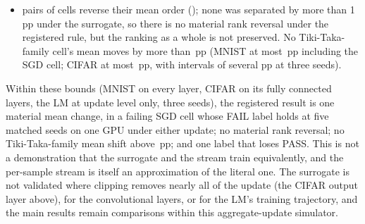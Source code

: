 \begin{itemize}
      ([\RYFidCifarEcramLiTangTwoZeroOneEightCttvTwoSeqLo, \RYFidCifarEcramLiTangTwoZeroOneEightCttvTwoSeqHi]\,pp) is wider and
      includes the line. This is not a failure, but the label is not preserved, and the difference interval
      ([\RXFidCifarEcramLiTangTwoZeroOneEightCttvTwoLo, \RXFidCifarEcramLiTangTwoZeroOneEightCttvTwoHi]\,pp) does not bound
      the change within $\pm1$\,pp.
\item \RYFidRevN{} pairs of cells reverse their mean order (\RYFidRevList); none was separated by more than 1\,pp under the
      surrogate, so there is no material rank reversal under the registered rule, but the ranking as a whole is not preserved.
      No Tiki-Taka-family cell's mean moves by more than \RXFidTtMaxAbs\,pp (MNIST at most \RXFidMnistMaxAbs\,pp including the
      SGD cell; CIFAR at most \RXFidCifarMaxAbs\,pp, with intervals of several pp at three seeds).
\end{itemize}
Within these bounds (MNIST on every layer, CIFAR on its fully connected layers, the LM at update level only, three seeds), the
registered result is one material mean change, in a failing SGD cell whose FAIL label holds at five matched seeds on one GPU under either update; no
material rank reversal; no Tiki-Taka-family mean shift above \RXFidTtMaxAbs\,pp; and one label that loses PASS. This is not a
demonstration that the surrogate and the stream train equivalently, and the per-sample stream is itself an approximation of the
literal one. The surrogate is not validated where clipping removes nearly all of the update (the CIFAR output layer above), for
the convolutional layers, or for the LM's training trajectory, and the main results remain comparisons within this
aggregate-update simulator.







